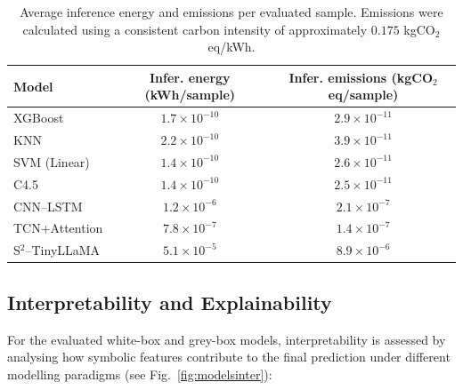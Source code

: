 \documentclass[preprint,12pt]{elsarticle}
\begin{document}
\begin{table}[t]
\centering
\scriptsize
\caption{Average inference energy and emissions per evaluated sample.
Emissions were calculated using a consistent carbon intensity of approximately
$0.175$ kgCO$_2$eq/kWh.}
\label{tab:inference_energy_appendix}

\begin{tabular}{lcc}
\toprule
\textbf{Model}
& \textbf{Infer. energy (kWh/sample)}
& \textbf{Infer. emissions (kgCO$_2$eq/sample)} \\
\midrule

XGBoost
& $1.7{\times}10^{-10}$
& $2.9{\times}10^{-11}$ \\

KNN
& $2.2{\times}10^{-10}$
& $3.9{\times}10^{-11}$ \\

SVM (Linear)
& $1.4{\times}10^{-10}$
& $2.6{\times}10^{-11}$ \\

C4.5
& $1.4{\times}10^{-10}$
& $2.5{\times}10^{-11}$ \\

CNN--LSTM
& $1.2{\times}10^{-6}$
& $2.1{\times}10^{-7}$ \\

TCN+Attention
& $7.8{\times}10^{-7}$
& $1.4{\times}10^{-7}$ \\

S$^2$--TinyLLaMA
& $5.1{\times}10^{-5}$
& $8.9{\times}10^{-6}$ \\

\bottomrule
\end{tabular}
\end{table}

\subsection{Interpretability and Explainability}

For the evaluated white-box and grey-box models, interpretability is assessed by analysing how symbolic features contribute to the final prediction under different modelling paradigms (see Fig.~\ref{fig:modelsinter}):
\end{document}
